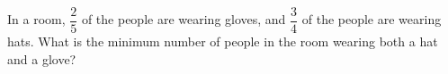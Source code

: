 In a room, $\dfrac{2}{5}$ of the people are wearing gloves, and $\dfrac{3}{4}$ of the people are wearing hats. What is the minimum number of people in the room wearing both a hat and a glove?
